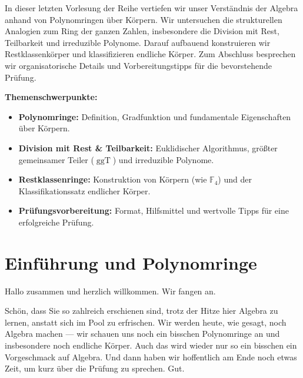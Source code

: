 


\begin{nice-box}
In dieser letzten Vorlesung der Reihe vertiefen wir unser Verständnis der Algebra anhand von Polynomringen über Körpern. Wir untersuchen die strukturellen Analogien zum Ring der ganzen Zahlen, insbesondere die Division mit Rest, Teilbarkeit und irreduzible Polynome. Darauf aufbauend konstruieren wir Restklassenkörper und klassifizieren endliche Körper. Zum Abschluss besprechen wir organisatorische Details und Vorbereitungstipps für die bevorstehende Prüfung.

\textbf{Themenschwerpunkte:}
\begin{itemize}
    \item \textbf{Polynomringe:} Definition, Gradfunktion und fundamentale Eigenschaften über Körpern.
    \item \textbf{Division mit Rest \& Teilbarkeit:} Euklidischer Algorithmus, größter gemeinsamer Teiler ($\operatorname{ggT}$) und irreduzible Polynome.
    \item \textbf{Restklassenringe:} Konstruktion von Körpern (wie $\mathbb{F}_4$) und der Klassifikationssatz endlicher Körper.
    \item \textbf{Prüfungsvorbereitung:} Format, Hilfsmittel und wertvolle Tipps für eine erfolgreiche Prüfung.
\end{itemize}
\end{nice-box}

\section{Einführung und Polynomringe}

\begin{spoken-clean}[00:00:00 - 00:00:38]
Hallo zusammen und herzlich willkommen. Wir fangen an. 

Schön, dass Sie so zahlreich erschienen sind, trotz der Hitze hier Algebra zu lernen, anstatt sich im Pool zu erfrischen. Wir werden heute, wie gesagt, noch Algebra machen --- wir schauen uns noch ein bisschen Polynomringe an und insbesondere noch endliche Körper. Auch das wird wieder nur so ein bisschen ein Vorgeschmack auf Algebra. Und dann haben wir hoffentlich am Ende noch etwas Zeit, um kurz über die Prüfung zu sprechen. Gut.
\end{spoken-clean}

